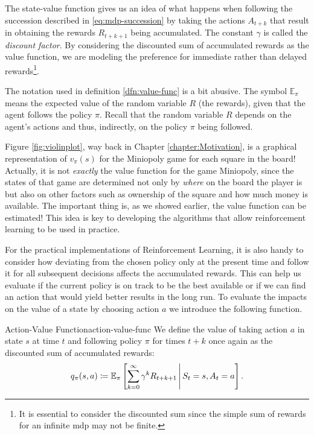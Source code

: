 The state-value function gives us an idea of what happens when following the
succession described in \eqref{eq:mdp-succession} by taking the actions
$A_{t+k}$ that result in obtaining the rewards $R_{t+k+1}$ being accumulated.
The constant $\gamma$ is called the \textit{discount factor}. By
considering the discounted sum of accumulated rewards as the value function, we
are modeling the preference for immediate rather than delayed
rewards\footnote{It is essential to consider the discounted sum since the simple
sum of rewards for an infinite \ac{mdp} may not be finite.}. 

The notation used in definition \ref{dfn:value-func} is a bit abusive. The
symbol $\mathbb{E}_{\pi}$ means the expected value of the random variable $R$
(the rewards), given that the agent follows the policy $\pi$. Recall that the
random variable $R$ depends on the agent's actions and thus, indirectly, on the
policy $\pi$ being followed.

Figure \ref{fig:violinplot}, way back in Chapter \ref{chapter:Motivation}, is
a graphical representation of $v_\pi (s)$ for the Miniopoly game for each square
in the board! Actually, it is not \textit{exactly} the value function for the
game Miniopoly, since the states of that game are determined not only by
\textit{where} on the board the player is but also on other factors such as
ownership of the square and how much money is available. The important thing is,
as we showed earlier, the value function can be estimated! This idea is key to
developing the algorithms that allow reinforcement learning to be used in
practice.

For the practical implementations of Reinforcement Learning, it is also handy to
consider how deviating from the chosen policy only at the present time and
follow it for all subsequent decisions affects the accumulated rewards. This can
help us evaluate if the current policy is on track to be the best available or
if we can find an action that would yield better results in the long run. To
evaluate the impacts on the value of a state by choosing action $a$ we introduce
the following function. 

\begin{dfn}{Action-Value Function}{action-value-func}
	We define the value of taking action $a$ in state $s$ at time $t$ and
	following policy $\pi$ for times $t+k$ once again as the discounted sum of
	accumulated rewards:
	\[
		q_\pi (s, a) \coloneqq \mathbb{E}_{\pi} \left[ \sum_{k=0}^{\infty} \gamma^{k} R_{t+k+1} \,\middle\vert\, S_t = s, A_t = a \right].
	\]
\end{dfn}

